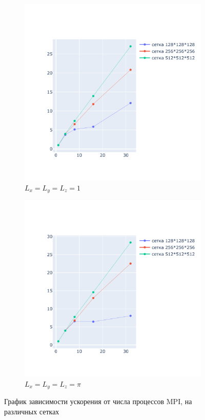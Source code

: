 \documentclass{article}
\begin{document}
\begin{figure}[!t]
\centering
\begin{subfigure}[b]{0.49\textwidth}
    \centering
    \includegraphics[width=\textwidth,trim=0 0 0 0,clip]{mpi_l_0.pdf}
    \caption{\(L_x=L_y=L_z=1\)}
    \label{img:1.1}
\end{subfigure}
\begin{subfigure}[b]{0.49\textwidth}
    \centering
    \includegraphics[width=\textwidth,trim=0 0 0 0,clip]{mpi_l_1.pdf}
    \caption{\(L_x=L_y=L_z=\pi\)}
    \label{img:1.2}
\end{subfigure}
\caption{График зависимости ускорения от числа процессов MPI, на различных сетках}
\end{figure}
\end{document}
